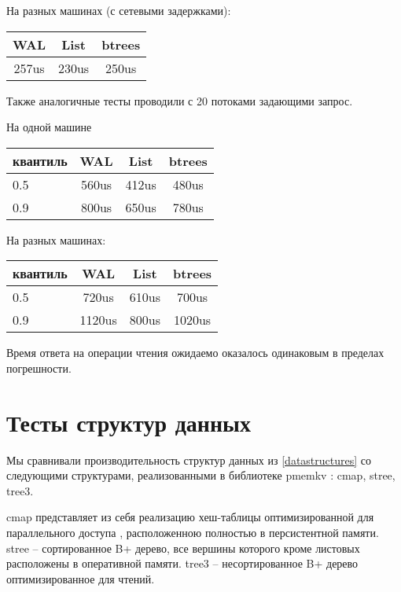 \documentclass[pdftex,ptm,12pt,a4paper]{report}
\theoremstyle{definition}
\begin{document}
На разных машинах (с сетевыми задержками):
\begin{center}
\begin{tabular} {|c c c|}
\hline
    WAL & List & btrees \\
    \hline
257us & 230us & 250us \\
\hline
\end{tabular}
\end{center}

Также аналогичные тесты проводили с 20 потоками задающими запрос.

На одной машине

\begin{center}
\begin{tabular} {|l |c c c|}
\hline
квантиль & WAL & List & btrees \\
\hline
0.5 & 560us & 412us & 480us \\
0.9 & 800us & 650us & 780us \\
\hline
\end{tabular}
\end{center}

На разных машинах:

\begin{center}
\begin{tabular} {|l |c c c|}
\hline
квантиль & WAL & List & btrees \\
\hline
0.5 & 720us & 610us & 700us \\
0.9 & 1120us & 800us & 1020us \\
\hline
\end{tabular}
\end{center}

Время ответа на операции чтения ожидаемо оказалось одинаковым в пределах погрешности.

\section{Тесты структур данных}
\label{pmemkvtests}

Мы сравнивали производительность структур данных из \ref{datastructures} со следующими структурами, реализованными в
библиотеке pmemkv \cite{pmemkv}: cmap, stree, tree3.

cmap представляет из себя реализацию хеш-таблицы оптимизированной для параллельного доступа \cite{malakhov2015perbucket}, расположенною полностью в персистентной памяти.
stree -- сортированное B+ дерево, все вершины которого кроме листовых расположены в оперативной памяти.
tree3 -- несортированное B+ дерево оптимизированное для чтений.
\end{document}
